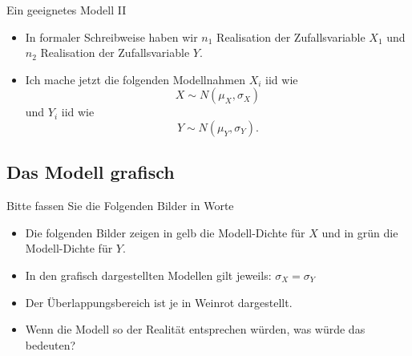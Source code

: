 \documentclass[usenames,dvipsnames,handout]{beamer}
\begin{document}
\begin{frame}{Ein geeignetes Modell II}
\begin{itemize}
\item{In formaler Schreibweise haben wir $n_{1}$ Realisation der Zufallsvariable $X_{1}$ und $n_{2}$ 
Realisation der Zufallsvariable $Y.$}
\item{Ich mache jetzt die folgenden Modellnahmen
$X_{i}$ iid wie 
\begin{equation}\label{eq1}
X \sim N(\mu_{X},\sigma_{X})
\end{equation}
und $Y_{i}$ iid wie
\begin{equation}\label{eq2}
Y \sim N(\mu_{Y},\sigma_{Y}).
\end{equation}
}
\end{itemize}
\end{frame}
\subsection{Das Modell grafisch}

\begin{frame}{Bitte fassen Sie die Folgenden Bilder in Worte}
\begin{itemize}
\item{Die folgenden Bilder zeigen in gelb die Modell-Dichte für $X$ und in grün
die Modell-Dichte für $Y.$}
\item{In den grafisch dargestellten Modellen gilt jeweils: $\sigma_{X}=\sigma_{Y}$}
\item{Der Überlappungsbereich ist je in Weinrot dargestellt.}
\item{Wenn die Modell so der Realität entsprechen würden, was würde das bedeuten?}
\end{itemize}
\end{frame}
\end{document}
